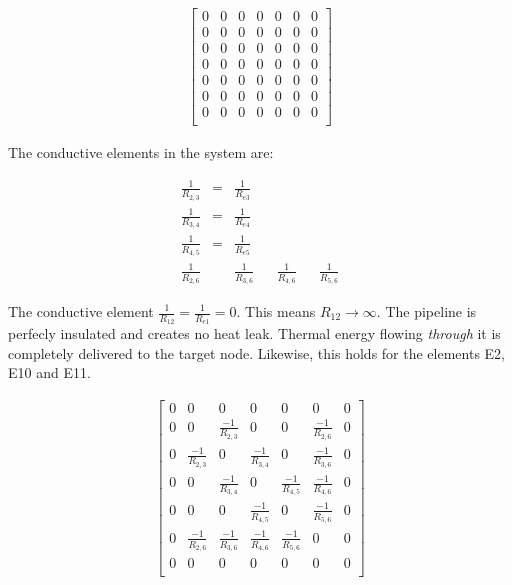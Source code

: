 \begin{equation}
	\begin{aligned}
		\begin{bmatrix}
			0 & 0 & 0 & 0 & 0 & 0 & 0\\
			0 & 0 & 0 & 0 & 0 & 0 & 0\\
			0 & 0 & 0 & 0 & 0 & 0 & 0\\
			0 & 0 & 0 & 0 & 0 & 0 & 0\\
			0 & 0 & 0 & 0 & 0 & 0 & 0\\
			0 & 0 & 0 & 0 & 0 & 0 & 0\\
			0 & 0 & 0 & 0 & 0 & 0 & 0\\
		\end{bmatrix}
	\end{aligned}
\end{equation}

The conductive elements in the system are:

\begin{equation}
	\begin{aligned}
        \frac{1}{R_{2,3}} & = & \frac{1}{R_{e3}} \\
        \frac{1}{R_{3,4}} & = & \frac{1}{R_{e4}} \\
        \frac{1}{R_{4,5}} & = & \frac{1}{R_{e5}} \\
        \frac{1}{R_{2,6}} & & \frac{1}{R_{3,6}} & & \frac{1}{R_{4,6}} & & \frac{1}{R_{5,6}} 
	\end{aligned}
\end{equation}

The conductive element $\frac{1}{R_{12}} = \frac{1}{R_{e1}} = 0$. This means $R_{12} \rightarrow \infty$. The pipeline is perfecly insulated and creates no heat leak. Thermal energy flowing \emph{through} it is completely delivered to the target node. Likewise, this holds for the elements E2, E10 and E11.

\begin{equation}
	\begin{aligned}
		\begin{bmatrix}
			0 & 0 & 0 & 0 & 0 & 0 & 0\\
            0 & 0 & \frac{-1}{R_{2,3}} & 0 & 0 & \frac{-1}{R_{2,6}} & 0 \\
            0 & \frac{-1}{R_{2,3}} & 0 & \frac{-1}{R_{3,4}} & 0 & \frac{-1}{R_{3,6}} & 0\\
            0 & 0 & \frac{-1}{R_{3,4}} & 0 & \frac{-1}{R_{4,5}} & \frac{-1}{R_{4,6}} & 0\\
            0 & 0 & 0 & \frac{-1}{R_{4,5}} & 0 & \frac{-1}{R_{5,6}} & 0 \\
            0 & \frac{-1}{R_{2,6}} & \frac{-1}{R_{3,6}} & \frac{-1}{R_{4,6}} & \frac{-1}{R_{5,6}} & 0 & 0\\
            0 & 0 & 0 & 0 & 0 & 0 & 0\\
		\end{bmatrix}
	\end{aligned}
\end{equation}

